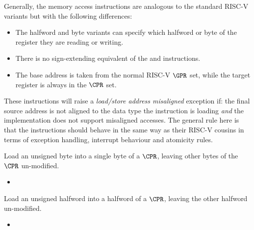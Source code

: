 Generally, the memory access instructions are analogous to
the standard RISC-V variants but with the following differences:

\begin{itemize}
\item The halfword and byte variants can specify which halfword or byte of
      the register they are reading or writing.
\item There is no sign-extending equivalent of the  and 
      instructions.
\item The base address is taken from the normal RISC-V $\GPR$ set, while the
      target register is always in the $\CPR$ set.
\end{itemize}

These instructions will raise a {\em load/store address misaligned} exception
if: the final source address is not aligned to the data type the instruction
is loading {\em and} the implementation does not support misaligned accesses.
The general rule here is that the  instructions should behave in
the same way as their RISC-V cousins in terms of exception handling,
interrupt behaviour and atomicity rules.


{\ienclbucr}
{
    Load an unsigned byte into a single byte of a $\CPR$, leaving other
    bytes of the $\CPR$ un-modified.
}{
\begin{itemize}
\item {}
\end{itemize}
}{}

{\ienclhucr}
{
Load an unsigned halfword into a halfword of a $\CPR$, leaving the other
halfword un-modified.
}{
\begin{itemize}
\item {}
\end{itemize}
}{}

